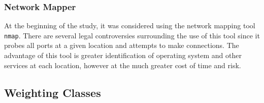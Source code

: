 \documentclass{article}
\theoremstyle{definition}
\begin{document}
\subsubsection{Network Mapper}
At the beginning of the study, it was considered using the network mapping tool \texttt{nmap}.
There are several legal controversies surrounding the use of this tool since it probes all ports at
a given location and attempts to make connections. The advantage of this tool is greater identification
of operating system and other services at each location, however at the much greater cost of time and
risk.


\subsection{Weighting Classes} \label{sec:weights}
\end{document}
